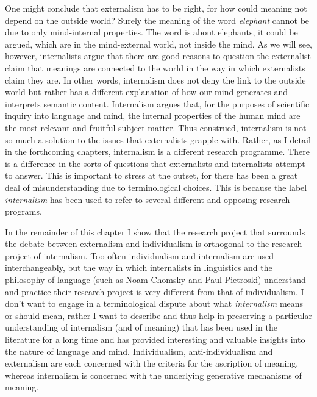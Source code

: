 One might conclude that externalism has to be right, for how could meaning not depend on the outside world? Surely the meaning of the word \textit{elephant} cannot be due to only mind-internal properties. The word is about elephants, it could be argued, which are in the mind-external world, not inside the mind. As we will see, however, internalists argue that there are good reasons to question the externalist claim that meanings are connected to the world in the way in which externalists claim they are. In other words, internalism does not deny the link to the outside world but rather has a different explanation of how our mind generates and interprets semantic content. Internalism argues that, for the purposes of scientific inquiry into language and mind, the internal properties of the human mind are the most relevant and fruitful subject matter. Thus construed, internalism is not so much a solution to the issues that externalists grapple with. Rather, as I detail in the forthcoming chapters, internalism is a different research programme. There is a difference in the sorts of questions that externalists and internalists attempt to answer. This is important to stress at the outset, for there has been a great deal of misunderstanding due to terminological choices. This is because the label \textit{internalism} has been used to refer to several different and opposing research programs.

In the remainder of this chapter I show that the research project that surrounds the debate between externalism and individualism is orthogonal to the research project of internalism. Too often individualism and internalism are used interchangeably, but the way in which internalists in linguistics and the philosophy of language (such as Noam Chomsky and Paul Pietroski) understand and practice their research project is very different from that of individualism. I don’t want to engage in a terminological dispute about what \textit{internalism} means or should mean, rather I want to describe and thus help in preserving a particular understanding of internalism (and of meaning) that has been used in the literature for a long time and has provided interesting and valuable insights into the nature of language and mind. Individualism, anti-individualism and externalism are each concerned with the criteria for the ascription of meaning, whereas internalism is concerned with the underlying generative mechanisms of meaning.

